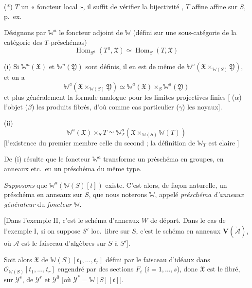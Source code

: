 \documentclass[11pt,a4paper]{article}
\begin{document}
 (*) \ill{} $T$ \ill{} un « foncteur local », il
suffit  de vérifier la bijectivité \ill{}, $T$
affine \struck{\ill{}} affine sur $S$\add{\ill{} \ill{} \ill{}}, p.\ ex.

Désignons par $\mathbb{W}^{a}$ le foncteur adjoint de
$\mathbb{W}$ (défini sur une  sous-catégorie de la catégorie
des $T$-préschémas)
\[
  \operatorname{Hom}_{S^{a}}(T^{a}, \mathfrak{X}) \simeq
  \operatorname{Hom}_{S}(T, \mathfrak{X})
\]

(i) Si $\mathbb{W}^{a}(\mathfrak{X})$ et $\mathbb{W}^{a}(\mathfrak{Y})$ sont
définis, il en est de même de $\mathbb{W}^{a}(\mathfrak{X}
\times_{\mathbb{W}(S)} \mathfrak{Y})$, et on a
\[
  \mathbb{W}^{a}(\mathfrak{X} \times_{\mathbb{W}(S)} \mathfrak{Y}) \simeq
  \mathbb{W}^{a}(\mathfrak{X}) \times_{S} \mathbb{W}^{a}(\mathfrak{Y})
\]
et \ill{} plus généralement  la formule analogue pour les limites
projectives finies [ ($\alpha$) l'objet 
($\beta$) les produits fibrés, d'où comme cas particulier ($\gamma$) les
noyaux].

(ii)
\[
  \mathbb{W}^{a}(\mathfrak{X}) \times_{S} T \simeq
  \mathbb{W}_{T}^{a}(\mathfrak{X} \times_{\mathbb{W}(S)} \mathbb{W}(T))
\]
[l'existence du premier membre  celle du second ; la
définition de $\mathbb{W}_T$ est claire \ill{}]

De (i) résulte que le foncteur $\mathbb{W}^{a}$ transforme un préschéma en
groupes, en anneaux etc.\ en un préschéma du même type.

\emph{Supposons} que $\mathbb{W}^{a}(\mathbb{W}(S)[t])$ existe. C'est
alors, de façon naturelle, un préschéma en anneaux sur $S$, que nous
noterons $\mathbb{W}$, appelé \emph{préschéma d'anneaux
générateur} du \emph{foncteur} $\mathbb{W}$.

[Dans l'exemple II, c'est le schéma d'anneaux $W$ de départ.
Dans le cas de l'exemple I,  si  on suppose
$S'$  loc.\ libre sur $S$, c'est le  schéma en
anneaux $\mathbf{V}(\check{\mathcal{A}})$, où $\mathcal{A}$ est le faisceau
d'algèbres sur $S$  à $S'$].

Soit alors $\mathfrak{X}$   de
$\mathbb{W}(S)[t_1, \ldots, t_r]$ défini par \struck{\ill{}} le faisceau
d'idéaux dans $\mathcal{O}_{\mathbb{W}(S)}[t_1, \ldots, t_r]$ engendré par
des sections $F_i$ ($i = 1, \ldots, s$), donc $\mathfrak{X}$ est le
 fibré, sur $\mathcal{Y}^{s}$, de $\mathcal{Y}^{r}$ et
$\mathcal{Y}^{0}$ [où $\mathcal{Y}^{*} = \mathbb{W}[S][t]$].
\end{document}
